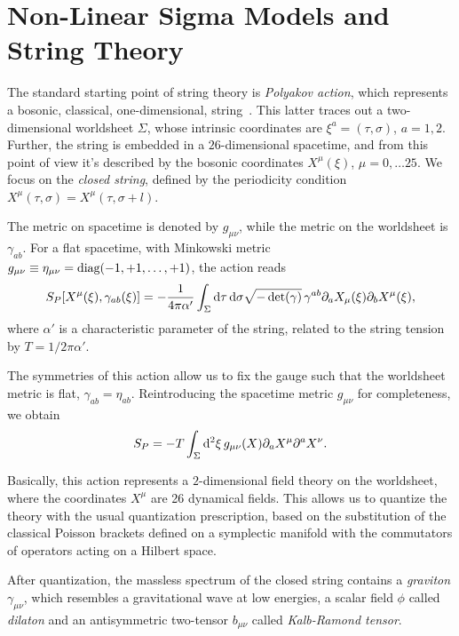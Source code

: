 \section{Non-Linear Sigma Models and String Theory}
The standard starting point of string theory is \emph{Polyakov action}, which represents a bosonic, classical, one-dimensional, string~\cite{weigand:string,polchinski:strings}. This latter traces out a two-dimensional worldsheet $\Sigma$, whose intrinsic coordinates are $\xi^a = (\tau, \sigma)$, $a = 1,2$. Further, the string is embedded in a $26$-dimensional spacetime, and from this point of view it's described by the bosonic coordinates $X^\mu(\xi)$, $\mu = 0, \dots 25$. We focus on the \emph{closed string}, defined by the periodicity condition $X^\mu(\tau,\sigma) = X^\mu (\tau, \sigma + l)$.

The metric on spacetime is denoted by $g_{\mu\nu}$, while the metric on the worldsheet is $\gamma_{ab}$. For a flat spacetime, with Minkowski metric $g_{\mu\nu} \equiv \eta_{\mu\nu} = \textup{diag}(-1,+1,\dots,+1)$, the action reads
\begin{equation}\label{eq:polyakov}
    S_P [X^\mu(\xi), \gamma_{ab}(\xi)] = -\frac{1}{4\pi\alpha'} \int_\Sigma \mathop{}\!\mathrm{d} \tau \mathop{}\!\mathrm{d} \sigma \sqrt{-\det(\gamma)} \, \gamma^{ab} \partial_a X_\mu (\xi) \partial_b X^\mu (\xi),
\end{equation}
where $\alpha'$ is a characteristic parameter of the string, related to the string tension by $T = 1 / 2\pi\alpha'$.

The symmetries of this action allow us to fix the gauge such that the worldsheet metric is flat, $\gamma_{ab} = \eta_{ab}$. Reintroducing the spacetime metric $g_{\mu\nu}$ for completeness, we obtain
\begin{equation}\label{eq:polyakov-metric}
    S_P = - T \int_\Sigma \mathop{}\!\mathrm{d}^2 \xi \, g_{\mu\nu}(X) \partial_a X^\mu \partial^a X^\nu.
\end{equation}

Basically, this action represents a $2$-dimensional field theory on the worldsheet, where the coordinates $X^\mu$ are 26 dynamical fields. This allows us to quantize the theory with the usual quantization prescription, based on the substitution of the classical Poisson brackets defined on a symplectic manifold with the commutators of operators acting on a Hilbert space.

After quantization, the massless spectrum of the closed string contains a \emph{graviton} $\gamma_{\mu\nu}$, which resembles a gravitational wave at low energies, a scalar field $\phi$ called \emph{dilaton} and an antisymmetric two-tensor $b_{\mu\nu}$ called \emph{Kalb-Ramond tensor}.

